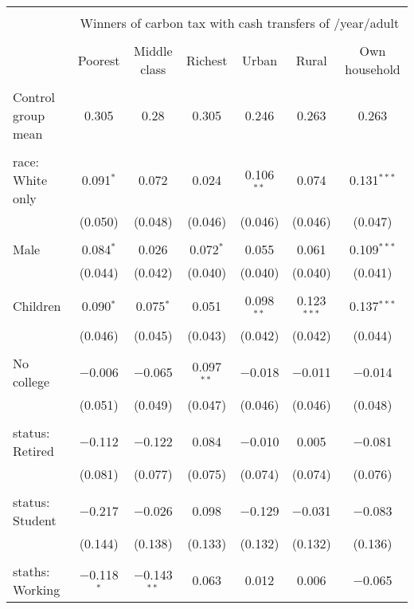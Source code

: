 
\begin{tabular}{@{\extracolsep{5pt}}lcccccc} 
\\[-1.8ex]\hline 
\hline \\[-1.8ex] 
 & \multicolumn{6}{c}{Winners of carbon tax with cash transfers of \textdollar 600/year/adult} \\ 
\cline{2-7} 
\\[-1.8ex] & Poorest & Middle class & Richest & Urban & Rural & Own household \\ 
\hline \\[-1.8ex] 
 Control group mean & 0.305 & 0.28 & 0.305 & 0.246 & 0.263 & 0.263  \\ \hline \\[-1.8ex] race: White only & 0.091$^{*}$ & 0.072 & 0.024 & 0.106$^{**}$ & 0.074 & 0.131$^{***}$ \\ 
  & (0.050) & (0.048) & (0.046) & (0.046) & (0.046) & (0.047) \\ 
  & & & & & & \\ 
 Male & 0.084$^{*}$ & 0.026 & 0.072$^{*}$ & 0.055 & 0.061 & 0.109$^{***}$ \\ 
  & (0.044) & (0.042) & (0.040) & (0.040) & (0.040) & (0.041) \\ 
  & & & & & & \\ 
 Children & 0.090$^{*}$ & 0.075$^{*}$ & 0.051 & 0.098$^{**}$ & 0.123$^{***}$ & 0.137$^{***}$ \\ 
  & (0.046) & (0.045) & (0.043) & (0.042) & (0.042) & (0.044) \\ 
  & & & & & & \\ 
 No college & $-$0.006 & $-$0.065 & 0.097$^{**}$ & $-$0.018 & $-$0.011 & $-$0.014 \\ 
  & (0.051) & (0.049) & (0.047) & (0.046) & (0.046) & (0.048) \\ 
  & & & & & & \\ 
 status: Retired & $-$0.112 & $-$0.122 & 0.084 & $-$0.010 & 0.005 & $-$0.081 \\ 
  & (0.081) & (0.077) & (0.075) & (0.074) & (0.074) & (0.076) \\ 
  & & & & & & \\ 
 status: Student & $-$0.217 & $-$0.026 & 0.098 & $-$0.129 & $-$0.031 & $-$0.083 \\ 
  & (0.144) & (0.138) & (0.133) & (0.132) & (0.132) & (0.136) \\ 
  & & & & & & \\ 
 staths: Working & $-$0.118$^{*}$ & $-$0.143$^{**}$ & 0.063 & 0.012 & 0.006 & $-$0.065 \\ 

\end{tabular}
